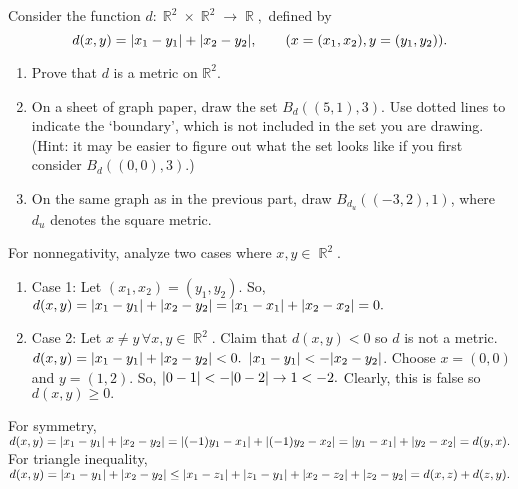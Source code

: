\documentclass[12pt,letterpaper,boxed]{hmcpset}
\DeclarePairedDelimiter\abs{\lvert}{\rvert}
\DeclareMathOperator{\R}{\mathbb{R}}
\begin{document}
\begin{problem}[Exercise 2.6.]
Consider the function $d: \R^{2} \times \R^{2} \rightarrow \R,$ defined by $$d(x, y) = \abs{x_1 - y_1} + \abs{x_2 - y_2}, \quad \quad (x = (x_1, x_2), y = (y_1, y_2)). $$
\vspace{-2mm}
\begin{enumerate}
	\itemsep0em
	\item Prove that $d$ is a metric on $\mathbb{R}^{2}.$
	\item On a sheet of graph paper, draw the set $B_{d}((5, 1), 3).$ Use dotted lines to indicate the ‘boundary’,
which is not included in the set you are drawing. (Hint: it may be easier to figure out what the
set looks like if you first consider $B_{d}((0, 0), 3).$)
	\item On the same graph as in the previous part, draw $B_{d_{u}}((-3, 2),1)$, where $d_{u}$ denotes the square metric.
\end{enumerate}
\end{problem}
\begin{solution}
For nonnegativity, analyze two cases where $x, y \in \R^{2}$.
\begin{enumerate}
	\itemsep0em
	\item Case 1: Let  $(x_1, x_2) = (y_1, y_2)$. So, $d(x, y) = \abs{x_1 - y_1} + \abs{x_2 - y_2} = \abs{x_1 - x_1} + \abs{x_2 - x_2} = 0.$ 
	\item Case 2: Let $x \neq y \, \forall x, y \in \R^{2}.$ Claim that $d(x, y) < 0$ so $d$ is not a metric. $d(x, y) = \abs{x_1 - y_1} + \abs{x_2 - y_2} < 0.$ $\abs{x_1 - y_1} < -\abs{x_2 - y_2}$. Choose $x = (0, 0)$ and $y = (1, 2)$. So, $\abs{0 - 1} < -\abs{0 - 2} \rightarrow 1 < -2.$ Clearly, this is false so $d(x,y) \ge 0.$ 
\end{enumerate}

For symmetry, $d(x, y) = \abs{x_1 - y_1} + \abs{x_2 - y_2} = \abs{(-1)y_1 - x_1} + \abs{(-1)y_2 - x_2} = \abs{y_1 - x_1} + \abs{y_2 - x_2} = d(y,x).$ \\
For triangle inequality, $d(x,y) = \abs{x_1 - y_1} + \abs{x_2 - y_2} \leq \abs{x_1 - z_1} + \abs{z_1 - y_1} + \abs{x_2 - z_2} + \abs{z_2 - y_2} = d(x, z) + d(z, y).$
\end{solution}
\end{document}
